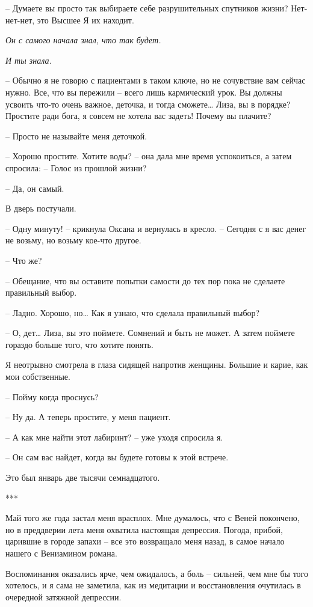 \documentclass[
]{book}
\begin{document}
-- Думаете вы просто так выбираете себе разрушительных спутников жизни? Нет-нет-нет, это Высшее Я их находит.

\emph{Он с самого начала знал, что так будет.}

\emph{И ты знала.}

-- Обычно я не говорю с пациентами в таком ключе, но не сочувствие вам сейчас нужно. Все, что вы пережили -- всего лишь кармический урок. Вы должны усвоить что-то очень важное, деточка, и тогда сможете\ldots{} Лиза, вы в порядке? Простите ради бога, я совсем не хотела вас задеть! Почему вы плачите?

-- Просто не называйте меня деточкой.

-- Хорошо простите. Хотите воды? -- она дала мне время успокоиться, а затем спросила: -- Голос из прошлой жизни?

-- Да, он самый.

В дверь постучали.

-- Одну минуту! -- крикнула Оксана и вернулась в кресло. -- Сегодня с я вас денег не возьму, но возьму кое-что другое.

-- Что же?

-- Обещание, что вы оставите попытки самости до тех пор пока не сделаете правильный выбор.

-- Ладно. Хорошо, но\ldots{} Как я узнаю, что сделала правильный выбор?

-- О, дет\ldots{} Лиза, вы это поймете. Сомнений и быть не может. А затем поймете гораздо больше того, что хотите понять.

Я неотрывно смотрела в глаза сидящей напротив женщины. Большие и карие, как мои собственные.

-- Пойму когда проснусь?

-- Ну да. А теперь простите, у меня пациент.

-- А как мне найти этот лабиринт? -- уже уходя спросила я.

-- Он сам вас найдет, когда вы будете готовы к этой встрече.

Это был январь две тысячи семнадцатого.

***

Май того же года застал меня врасплох. Мне думалось, что с Веней покончено, но в преддверии лета меня охватила настоящая депрессия. Погода, прибой, царившие в городе запахи -- все это возвращало меня назад, в самое начало нашего с Вениамином романа.

Воспоминания оказались ярче, чем ожидалось, а боль -- сильней, чем мне бы того хотелось, и я сама не заметила, как из медитации и восстановления очутилась в очередной затяжной депрессии.
\end{document}
